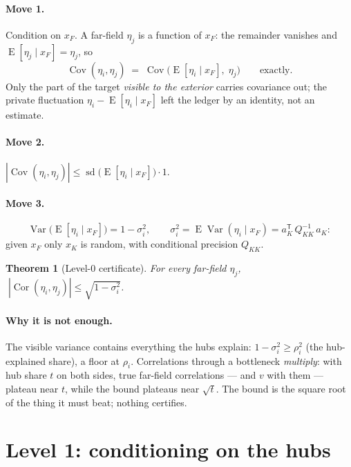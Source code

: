 \documentclass[11pt]{article}
\newtheorem{theorem}{Theorem}[section]
\theoremstyle{remark}
\newcommand{\Var}{\operatorname{Var}}
\newcommand{\Cov}{\operatorname{Cov}}
\newcommand{\Cor}{\operatorname{Cor}}
\newcommand{\E}{\operatorname{E}}
\newcommand{\sd}{\operatorname{sd}}
\newcommand{\tr}{^{\mathsf T}}
\begin{document}
\paragraph{Move 1.}  Condition on $x_F$.  A far-field $\eta_j$ is a
function of $x_F$: the remainder vanishes and
$\E[\eta_j\mid x_F] = \eta_j$, so
\begin{equation}
  \Cov(\eta_i,\eta_j) \;=\; \Cov\bigl(\E[\eta_i\mid x_F],\; \eta_j\bigr)
  \qquad\text{exactly.}
  \label{eq:lvl0rewrite}
\end{equation}
Only the part of the target \emph{visible to the exterior} carries
covariance out; the private fluctuation
$\eta_i - \E[\eta_i\mid x_F]$ left the ledger by an identity, not an
estimate.

\paragraph{Move 2.}
$|\Cov(\eta_i,\eta_j)| \le \sd\bigl(\E[\eta_i\mid x_F]\bigr)\cdot 1$.

\paragraph{Move 3.}
\[
  \Var\bigl(\E[\eta_i\mid x_F]\bigr)
  = 1 - \sigma_i^2,
  \qquad
  \sigma_i^2 = \E\Var(\eta_i\mid x_F) = a_K\tr\, Q_{KK}^{-1}\, a_K :
\]
given $x_F$ only $x_K$ is random, with conditional precision $Q_{KK}$.

\begin{theorem}[Level-0 certificate]\label{thm:lvl0}
For every far-field $\eta_j$,
$\;|\Cor(\eta_i,\eta_j)| \le \sqrt{1 - \sigma_i^2}$.
\end{theorem}

\paragraph{Why it is not enough.}  The visible variance contains
everything the hubs explain: $1 - \sigma_i^2 \ge \rho_i^2$ (the
hub-explained share), a floor at $\rho_i$.  Correlations through a
bottleneck \emph{multiply}: with hub share $t$ on both sides, true
far-field correlations --- and $v$ with them --- plateau near $t$,
while the bound plateaus near $\sqrt t$.  The bound is the square root
of the thing it must beat; nothing certifies.

\section{Level 1: conditioning on the hubs}\label{sec:level1}
\end{document}
